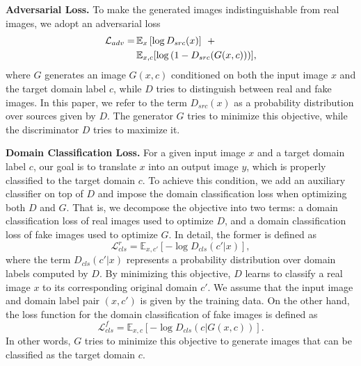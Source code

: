 \documentclass[10pt,twocolumn,letterpaper]{article}
\begin{document}
\medskip

\noindent \textbf{Adversarial Loss.} To make the generated images indistinguishable from real images, we adopt an adversarial loss
\begin{equation}
\begin{split}
 \mathcal{L}_{adv} = & \thinspace {\mathbb{E}}_{x} \left[ \log{{D}_{src}(x)} \right]  \> \>  +   \\
 & \thinspace {\mathbb{E}}_{x, c}[\log{(1 - {D}_{src}(G(x, c)))}],
\end{split}
\label{eq1}
\end{equation}
\noindent where $G$ generates an image $G(x, c)$ conditioned on both the input image $x$ and the target domain label $c$, while $D$ tries to distinguish between real and fake images. In this paper, we refer to the term ${D}_{src}(x)$ as a probability distribution over sources given by $D$. The generator $G$ tries to minimize this objective, while the discriminator $D$ tries to maximize it.

\medskip

\noindent \textbf{Domain Classification Loss.} For a given input image $x$ and a target domain label $c$, our goal is to translate $x$ into an output image $y$, which is properly classified to the target domain $c$. To achieve this condition, we add an auxiliary classifier on top of $D$ and impose the domain classification loss when optimizing both $D$ and $G$. That is, we decompose the objective into two terms: a domain classification loss of real images used to optimize $D$, and a domain classification loss of fake images used to optimize $G$. In detail, the former is defined as
\begin{equation}
\mathcal{L}_{cls}^{r} = {\mathbb{E}}_{x, c'}[-\log{{D}_{cls}(c'|x)}],
\label{eq2}
\end{equation}
where the term ${D}_{cls}(c'|x)$ represents a probability distribution over domain labels computed by $D$. By minimizing this objective, $D$ learns to classify a real image $x$ to its corresponding original domain $c'$. We assume that the input image and domain label pair $(x, c')$ is given by the training data. On the other hand, the loss function for the domain classification of fake images is defined as
\begin{equation}
\mathcal{L}_{cls}^{f} ={\mathbb{E}}_{x, c}[-\log{{D}_{cls}(c|G(x, c))}].
\label{eq3}
\end{equation}
In other words, $G$ tries to minimize this objective to generate images that can be classified as the target domain $c$. 
\end{document}
